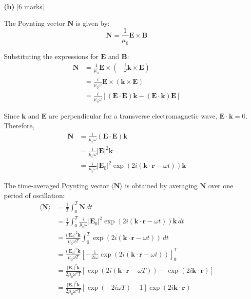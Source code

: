 \documentclass{article}
\begin{document}
\textbf{(b)} [6 marks]

The Poynting vector $\mathbf{N}$ is given by:
\begin{equation*}
\mathbf{N} = \frac{1}{\mu_0} \mathbf{E} \times \mathbf{B}
\end{equation*}

Substituting the expressions for $\mathbf{E}$ and $\mathbf{B}$:
\begin{align*}
\mathbf{N} &= \frac{1}{\mu_0} \mathbf{E} \times \left( -\frac{i}{\omega} \mathbf{k} \times \mathbf{E} \right) \\
&= \frac{i}{\mu_0 \omega} \mathbf{E} \times (\mathbf{k} \times \mathbf{E}) \\
&= \frac{i}{\mu_0 \omega} [(\mathbf{E} \cdot \mathbf{E})\mathbf{k} - (\mathbf{E} \cdot \mathbf{k})\mathbf{E}]
\end{align*}

Since $\mathbf{k}$ and $\mathbf{E}$ are perpendicular for a transverse electromagnetic wave, $\mathbf{E} \cdot \mathbf{k} = 0$. Therefore,
\begin{align*}
\mathbf{N} &= \frac{i}{\mu_0 \omega} (\mathbf{E} \cdot \mathbf{E})\mathbf{k} \\
&= \frac{i}{\mu_0 \omega} |\mathbf{E}|^2 \mathbf{k} \\
&= \frac{i}{\mu_0 \omega} |\mathbf{E}_0|^2 \exp(2i (\mathbf{k} \cdot \mathbf{r} - \omega t)) \mathbf{k}
\end{align*}

The time-averaged Poynting vector $\langle \mathbf{N} \rangle$ is obtained by averaging $\mathbf{N}$ over one period of oscillation:
\begin{align*}
\langle \mathbf{N} \rangle &= \frac{1}{T} \int_0^T \mathbf{N} \, dt \\
&= \frac{1}{T} \int_0^T \frac{i}{\mu_0 \omega} |\mathbf{E}_0|^2 \exp(2i (\mathbf{k} \cdot \mathbf{r} - \omega t)) \mathbf{k} \, dt \\
&= \frac{i |\mathbf{E}_0|^2 \mathbf{k}}{\mu_0 \omega T} \int_0^T \exp(2i (\mathbf{k} \cdot \mathbf{r} - \omega t)) \, dt \\
&= \frac{i |\mathbf{E}_0|^2 \mathbf{k}}{\mu_0 \omega T} \left[ -\frac{1}{2i\omega} \exp(2i (\mathbf{k} \cdot \mathbf{r} - \omega t)) \right]_0^T \\
&= \frac{|\mathbf{E}_0|^2 \mathbf{k}}{2 \mu_0 \omega^2 T} [\exp(2i (\mathbf{k} \cdot \mathbf{r} - \omega T)) - \exp(2i \mathbf{k} \cdot \mathbf{r})] \\
&= \frac{|\mathbf{E}_0|^2 \mathbf{k}}{2 \mu_0 \omega^2 T} [\exp(-2i \omega T) - 1] \exp(2i \mathbf{k} \cdot \mathbf{r})
\end{align*}
\end{document}
